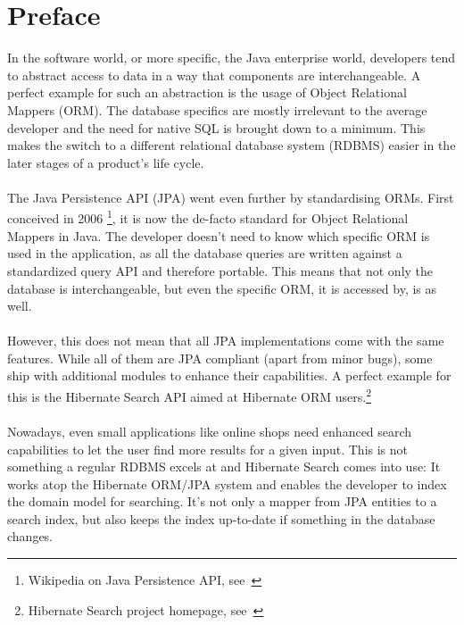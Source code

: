 \section{Preface}\label{Preface}
In the software world, or more specific, the Java enterprise world, developers tend to abstract access to data in a way that components are interchangeable. A perfect example for such an abstraction is the usage of Object Relational Mappers (ORM). The database specifics are mostly irrelevant to the average developer and the need for native SQL is brought down to a minimum. This makes the switch to a different relational database system (RDBMS) easier in the later stages of a product's life cycle.
\\\\
The Java Persistence API (JPA) went even further by standardising ORMs. First conceived in 2006 \footnote{Wikipedia on Java Persistence API, see~\cite{wiki_jpa}}, it is now the de-facto standard for Object Relational Mappers in Java. The developer doesn't need to know which specific ORM is used in the application, as all the database queries are written against a standardized query API and therefore portable. This means that not only the database is interchangeable, but even the specific ORM, it is accessed by, is as well.
\\\\
However, this does not mean that all JPA implementations come with the same features. While all of them are JPA compliant (apart from minor bugs), some ship with additional modules to enhance their capabilities. A perfect example for this is the Hibernate Search API aimed at Hibernate ORM users.\footnote{Hibernate Search project homepage, see~\cite{hibernate_search_homepage}}
\\\\
Nowadays, even small applications like online shops need enhanced search capabilities to let the user find more results for a given input.
This is not something a regular RDBMS excels at and Hibernate Search comes into use: It works atop the Hibernate ORM/JPA system and enables the developer to index the domain model for searching. It's not only a mapper from JPA entities to a search index, but also keeps the index up-to-date if something in the database changes.
\\
